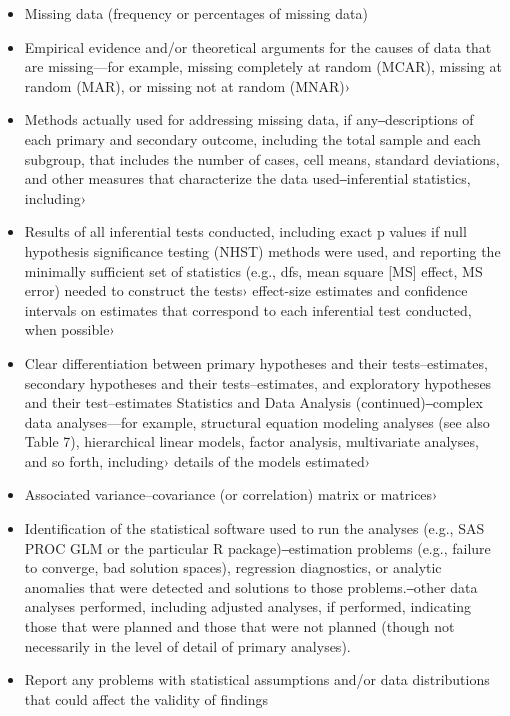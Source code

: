 \documentclass[acmsmall]{acmart}
\begin{document}
\begin{itemize}
    \item Missing data (frequency or percentages of missing data)
    \item Empirical evidence and/or theoretical arguments for the causes of data that are missing—for example, missing completely at random (MCAR), missing at random (MAR), or missing not at random (MNAR)›   
    \item Methods actually used for addressing missing data, if any‒descriptions of each primary and secondary outcome, including the total sample  and each subgroup, that includes the number of cases, cell means, standard deviations, and other measures that characterize the data used‒inferential statistics, including›   
    \item Results of all inferential tests conducted, including exact p values if null hypothesis significance testing (NHST) methods were used, and reporting the minimally sufficient set of statistics (e.g., dfs, mean square [MS] effect, MS error) needed to construct  the tests›   effect-size estimates and confidence intervals on estimates that correspond  to each inferential test conducted, when possible›   
    \item Clear differentiation between primary hypotheses and their tests–estimates,  secondary hypotheses and their tests–estimates, and exploratory hypotheses  and their test–estimates Statistics and Data Analysis (continued)‒complex data analyses—for example, structural equation modeling analyses (see also Table 7), hierarchical linear models, factor analysis, multivariate analyses, and so forth, including›   details of the models estimated›   
    \item Associated variance–covariance (or correlation) matrix or matrices›   
    \item Identification of the statistical software used to run the analyses (e.g., SAS PROC GLM or the particular R package)‒estimation problems (e.g., failure to converge, bad solution spaces), regression diagnostics, or analytic anomalies that were detected and solutions to those problems.‒other data analyses performed, including adjusted analyses, if performed, indicating those that were planned and those that were not planned (though not necessarily in the level of detail of primary analyses).
    \item Report any problems with statistical assumptions and/or data distributions that could affect the validity of findings

\end{itemize}
\end{document}
